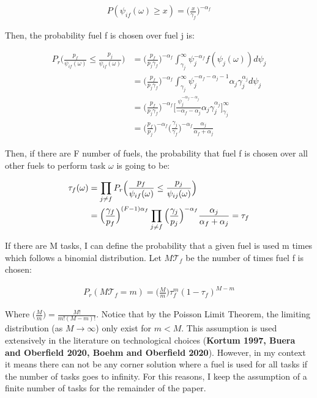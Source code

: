 \documentclass{article}
\begin{document}
\begin{align*}
    P(\psi_{if}(\omega) \geq x) = \Big(\frac{x}{\gamma_f}\Big)^{-\alpha_f}
\end{align*}

Then, the probability fuel f is chosen over fuel j is:

\begin{align*}
    P_r\Big(\frac{p_f}{\psi_{if}(\omega)} \leq \frac{p_j}{\psi_{if}(\omega)}\Big) &= \Big( \frac{p_f}{p_j \gamma_f}\Big)^{-\alpha_f} \int_{\gamma_j}^{\infty} \psi_j^{-\alpha_f}f(\psi_j(\omega)) d\psi_j \\
    &= \Big( \frac{p_f}{p_j \gamma_f}\Big)^{-\alpha_f} \int_{\gamma_j}^{\infty} \psi_j^{-\alpha_f-\alpha_j-1} \alpha_j \gamma_j^{\alpha_j} d\psi_j \\
    &= \Big( \frac{p_f}{p_j \gamma_f}\Big)^{-\alpha_f} \Big[ \frac{\psi_j^{-\alpha_f-\alpha_j}}{-\alpha_f-\alpha_j} \alpha_j \gamma_j^{\alpha_j} \Big]_{\gamma_j}^{\infty} \\
    &= \Big( \frac{p_f}{p_j} \Big)^{-\alpha_f} \Big( \frac{\gamma_j}{\gamma_f} \Big)^{-\alpha_f} \frac{\alpha_j}{\alpha_f+\alpha_j}
\end{align*}

Then, if there are F number of fuels, the probability that fuel f is chosen over all other fuels to perform task $\omega$ is going to be:

\begin{align}
    \tau_f(\omega) &=  \prod_{j \neq f} P_r\Big(\frac{p_f}{\psi_{if}(\omega)} \leq \frac{p_j}{\psi_{ij}(\omega)}\Big) \notag\\ 
    &= \Big( \frac{\gamma_f}{p_f} \Big)^{(F-1)\alpha_f} \prod_{j \neq f} \Big( \frac{\gamma_j}{p_j} \Big)^{-\alpha_f} \frac{\alpha_j}{\alpha_f + \alpha_j} = \tau_f
\end{align}

If there are M tasks, I can define the probability that a given fuel is used m times which follows a binomial distribution. Let $M \mathcal{T}_f$ be the number of times fuel f is chosen:

\begin{align}
    P_r(M \mathcal{T}_f = m) =  \Big( \frac{M}{m} \Big)\tau_f^{m}(1-\tau_f)^{M-m}
\end{align}

Where $\big( \frac{M}{m} \big) = \frac{M!}{m!(M-m)!}$. Notice that by the Poisson Limit Theorem, the limiting distribution (as $M \rightarrow \infty$) only exist for $m < M$. This assumption is used extensively in the literature on technological choices (\textbf{Kortum 1997, Buera and Oberfield 2020, Boehm and Oberfield 2020}). However, in my context it means there can not be any corner solution where a fuel is used for all tasks if the number of tasks goes to infinity. For this reasons, I keep the assumption of a finite number of tasks for the remainder of the paper.
\end{document}
